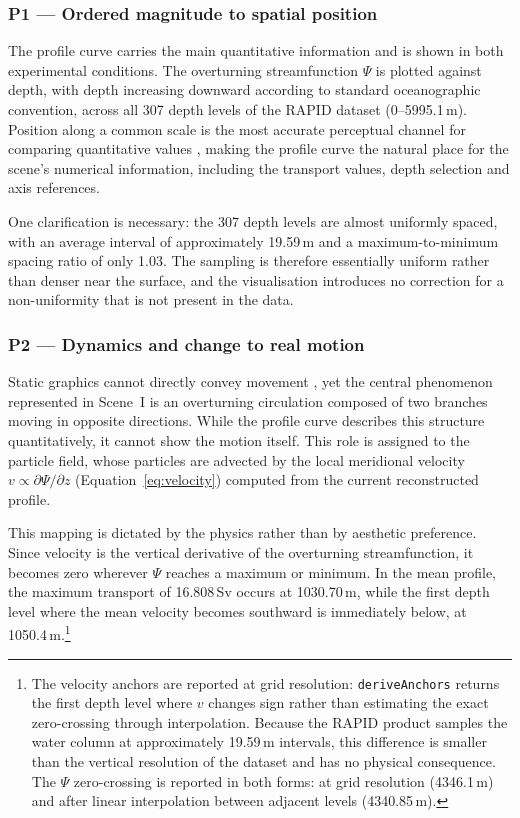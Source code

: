 \subsubsection*{P1 --- Ordered magnitude to spatial position}

The profile curve carries the main quantitative information and is shown in both experimental conditions. The overturning streamfunction $\Psi$ is plotted against depth, with depth increasing downward according to standard oceanographic convention, across all 307 depth levels of the RAPID dataset (0--5995.1\,m). Position along a common scale is the most accurate perceptual channel for comparing quantitative values \parencite{clevelandmcgill1984}, making the profile curve the natural place for the scene's numerical information, including the transport values, depth selection and axis references.

One clarification is necessary: the 307 depth levels are almost uniformly spaced, with an average interval of approximately 19.59\,m and a maximum-to-minimum spacing ratio of only 1.03. The sampling is therefore essentially uniform rather than denser near the surface, and the visualisation introduces no correction for a non-uniformity that is not present in the data.

\subsubsection*{P2 --- Dynamics and change to real motion}

Static graphics cannot directly convey movement \parencite{sterman2008,cronin2009}, yet the central phenomenon represented in Scene~I is an overturning circulation composed of two branches moving in opposite directions. While the profile curve describes this structure quantitatively, it cannot show the motion itself. This role is assigned to the particle field, whose particles are advected by the local meridional velocity $v \propto \partial\Psi/\partial z$ (Equation~\ref{eq:velocity}) computed from the current reconstructed profile.

This mapping is dictated by the physics rather than by aesthetic preference. Since velocity is the vertical derivative of the overturning streamfunction, it becomes zero wherever $\Psi$ reaches a maximum or minimum. In the mean profile, the maximum transport of 16.808\,Sv occurs at 1030.70\,m, while the first depth level where the mean velocity becomes southward is immediately below, at 1050.4\,m.\footnote{The velocity anchors are reported at grid resolution: \texttt{deriveAnchors} returns the first depth level where $v$ changes sign rather than estimating the exact zero-crossing through interpolation. Because the RAPID product samples the water column at approximately 19.59\,m intervals, this difference is smaller than the vertical resolution of the dataset and has no physical consequence. The $\Psi$ zero-crossing is reported in both forms: at grid resolution (4346.1\,m) and after linear interpolation between adjacent levels (4340.85\,m).}

